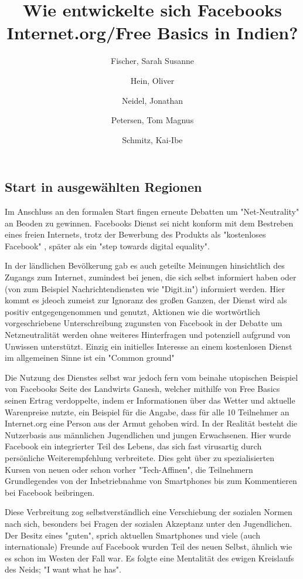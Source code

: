 \documentclass{article}
\title{Wie entwickelte sich Facebooks Internet.org/Free Basics in Indien?}
\author{
  Fischer, Sarah Susanne\\
  \and
  Hein, Oliver\\
  \and
  Neidel, Jonathan\\
  \and
  Petersen, Tom Magnus\\
  \and
  Schmitz, Kai-Ibe\\
}
\begin{document}
\maketitle
\subsection{Start in ausgewählten Regionen}

Im Anschluss an den formalen Start fingen erneute Debatten um "Net-Neutrality" an Beoden zu gewinnen. Facebooks Dienst sei nicht konform mit dem Bestreben eines freien Internets, trotz der Bewerbung des Produkts als "kostenloses Facebook"%
 , später als ein "step towards digital equality".

\medskip

In der ländlichen Bevölkerung gab es auch geteilte Meinungen hinsichtlich des Zugangs zum Internet, zumindest bei jenen, die sich selbst informiert haben oder (von zum Beispiel Nachrichtendiensten wie "Digit.in") %
informiert werden. Hier kommt es jdeoch zumeist zur Ignoranz des großen Ganzen, der Dienst wird als positiv entgegengenommen und genutzt, Aktionen wie die wortwörtlich vorgeschriebene Unterschreibung zugunsten von Facebook in der Debatte um Netzneutralität %
werden ohne weiteres Hinterfragen und potenziell aufgrund von Unwissen unterstützt. Einzig ein initielles Interesse an einem kostenlosen Dienst im allgemeinen Sinne ist ein "Common ground" %

\medskip

Die Nutzung des Dienstes selbst war jedoch fern vom beinahe utopischen Beispiel von Facebooks Seite des Landwirts Ganesh, welcher mithilfe von Free Basics seinen Ertrag verdoppelte, indem er Informationen über das Wetter und aktuelle Warenpreise nutzte, ein Beispiel für die Angabe, dass für alle 10 Teilnehmer an Internet.org eine Person aus der Armut gehoben wird. %
In der Realität besteht die Nutzerbasis aus männlichen Jugendlichen und jungen Erwachsenen. Hier wurde Facebook ein integrierter Teil des Lebens, das sich fast virusartig durch persönliche Weiterempfehlung verbreitete. Dies geht über zu spezialisierten Kursen von neuen oder schon vorher "Tech-Affinen", die Teilnehmern Grundlegendes von der Inbetriebnahme von Smartphones bis zum Kommentieren bei Facebook beibringen.

\medskip

Diese Verbreitung zog selbstverständlich eine Verschiebung der sozialen Normen nach sich, besonders bei Fragen der sozialen Akzeptanz unter den Jugendlichen. Der Besitz eines "guten", sprich aktuellen Smartphones und viele (auch internationale) Freunde auf Facebook wurden Teil des neuen Selbst, ähnlich wie es schon im Westen der Fall war. Es folgte eine Mentalität des ewigen Kreislaufs des Neids; "I want what he has".
\end{document}
